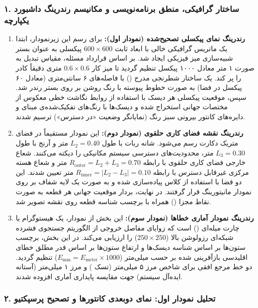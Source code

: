 \documentclass{article}
\begin{document}
\subsubsection*{۱. ساختار گرافیکی، منطق برنامه‌نویسی و مکانیسم رندرینگ داشبورد یکپارچه}

\begin{enumerate}
	\item \textbf{رندرینگ نمای پیکسلی تصحیح‌شده (نمودار اول):} برای رسم این زیرنمودار، ابتدا یک ماتریس گرافیکی خالی با ابعاد ثابت $600 \times 600$ پیکسلی به عنوان بستر شبیه‌سازی میز فیزیکی ایجاد شد. بر اساس قرارداد مسئله، مقیاس تبدیل به صورت ۱ متر معادل ۱۰۰۰ پیکسل تنظیم گردید تا میز کار $0.6 \times 0.6$ متری دقیقاً کادر را پر کند. یک ساختار شطرنجی مدرج () با فاصله‌های ۶ سانتی‌متری (معادل ۶۰ پیکسل در فضا) به صورت خطوط پیوسته با رنگ روشن بر روی بستر رندر شد. سپس، موقعیت پیکسلی هر دیسک با استفاده از روابط نگاشت خطی معکوس از مختصات جهانی استخراج شده و دیسک‌ها با رنگ‌های تفکیک‌شده‌ی مبنای  و دایره‌های کانتور بیرونی سبز رنگ (نمایانگر وضعیت «در دسترس») ترسیم شدند.
	
	\item \textbf{رندرینگ نقشه فضای کاری حلقوی (نمودار دوم):} این نمودار مستقیماً در فضای متریک دکارت رسم می‌شود. شانه ربات با طول $L_2 = 0.40$ متر و آرنج با طول $L_3 = 0.30$ متر، محدودیت‌های دسترسی سیستم مکانیکی را دیکته می‌کنند. شعاع خارجی فضای کاری حلقوی با رابطه $R_{\text{outer}} = L_2 + L_3 = 0.70$ متر و شعاع هسته مرکزی غیرقابل دسترس با رابطه $R_{\text{inner}} = |L_2 - L_3| = 0.10$ متر تعیین شدند. این دو فضا با استفاده از کلاس  پیاده‌سازی شده و به صورت یک لایه شفاف بر روی نمودار مانیتورینگ قرار گرفتند. در نهایت، بردار موقعیت جهانی هر قطعه به صورت نقاط مجزا () همراه با برچسب شناسه قطعه روی نقشه تصویر شد.
	
	\item \textbf{رندرینگ نمودار آماری خطاها (نمودار سوم):} این بخش از نمودار، یک هیستوگرام یا چارت میله‌ای ()  است که زوایای مفاصل خروجی از الگوریتم جستجوی فشرده شبکه‌ای رزولوشن بالا ($250 \times 250$) را ارزیابی می‌کند. در این بخش، برچسب ستون‌ها بر اساس شناسه دیسک‌ها و ارتفاع ستون‌ها بر اساس قدر مطلق خطای اقلیدسی بازآفرینی شده بر حسب میلی‌متر ($E_{\text{mm}} = E_{\text{meter}} \times 1000$) تنظیم گردید. دو خط مرجع افقی برای شاخص مرز ۵ میلی‌متر (تسک ) و مرز ۱ میلی‌متر (آستانه ایده‌آل سیستم) جهت مقایسه پایداری آماری افزوده شدند.
\end{enumerate}

\subsubsection*{۲. تحلیل نمودار اول: نمای دوبعدی کانتورها و تصحیح پرسپکتیو}
\end{document}

